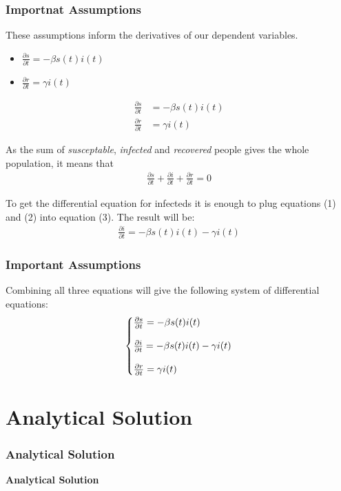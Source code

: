\documentclass{beamer}
\makeatletter
\newenvironment{system}%
{\left\lbrace\begin{array}{@{}l@{}}}%
{\end{array}\right.}
\makeatother
\begin{document}
\begin{frame}[t]\frametitle{Importnat Assumptions}
These assumptions inform the derivatives of our dependent variables.
    \begin{itemize}
        \item $\frac{\partial{s}}{\partial{t}}=-\beta s(t)i(t)$
        \item $\frac{\partial{r}}{\partial{t}}=\gamma i(t)$
    \end{itemize}
\begin{align}
    \frac{\partial{s}}{\partial{t}}&=-\beta s(t)i(t)\\
    \frac{\partial{r}}{\partial{t}}&=\gamma i(t)
\end{align}

As the sum of \textit{susceptable}, \textit{infected} and \textit{recovered} people gives the whole population, it means that
\begin{align}
    \frac{\partial{s}}{\partial{t}}+\frac{\partial{i}}{\partial{t}}+\frac{\partial{r}}{\partial{t}}=0
\end{align}

To get the differential equation for infecteds it is enough to plug equations (1) and (2)
into equation (3). The result will be:
    \begin{align}
        \frac{\partial{i}}{\partial{t}}=-\beta s(t)i(t)-\gamma i(t)
    \end{align}
\end{frame}

\begin{frame}\frametitle{Important Assumptions}
Combining all three equations will give the following system of differential equations:
\begin{equation*}
    \begin{system}
        \frac{\partial{s}}{\partial{t}}=-\beta s(t)i(t)\\
        \\
        \frac{\partial{i}}{\partial{t}}=-\beta s(t)i(t)-\gamma i(t)\\
        \\
        \frac{\partial{r}}{\partial{t}}=\gamma i(t)
    \end{system}
\end{equation*}
\end{frame}

\section{Analytical Solution}
\begin{frame}\frametitle{Analytical Solution}
\begin{center}
    \textbf{Analytical Solution}
\end{center}
\end{frame}
\end{document}
